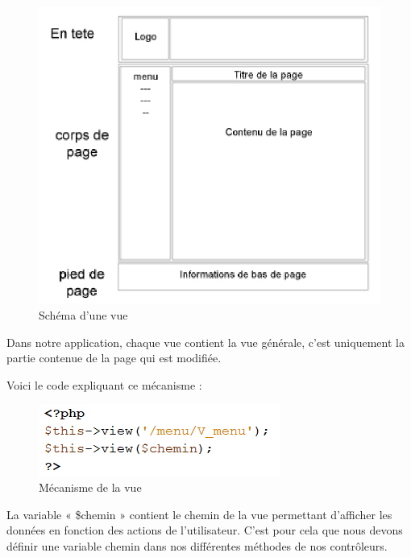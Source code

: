 \documentclass[noposter]{polytech/polytech}
\begin{document}
\begin{figure}
	\includegraphics[scale=0.7]{images/schemaVue}
	\caption{Schéma d'une vue}
	\label{fig:schemaVues}
\end{figure}

Dans notre application, chaque vue contient la vue générale, c'est uniquement la partie contenue de la page qui est modifiée. 

Voici le code expliquant ce mécanisme : 

\begin{figure}
	\includegraphics[scale=1]{images/vue}
	\caption{Mécanisme de la vue}
	\label{fig:vue}
\end{figure}


La variable « \$chemin » contient le chemin de la vue permettant d’afficher les données en fonction des actions de l'utilisateur. C'est pour cela que nous devons définir une variable chemin dans nos différentes méthodes de nos contrôleurs. 
\end{document}
